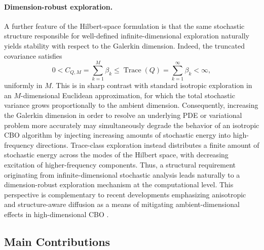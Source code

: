 \documentclass[12pt]{amsart}
\numberwithin{equation}{section}
\begin{document}
\paragraph{\textbf{Dimension-robust exploration.}}
A further feature of the Hilbert-space formulation is that the same stochastic structure responsible for well-defined infinite-dimensional exploration naturally yields stability with respect to the Galerkin dimension. Indeed, the truncated covariance satisfies
\begin{equation*}
    0<C_{Q,M}=\sum_{k=1}^M\beta_k\leq \operatorname{Trace}(Q)=\sum_{k=1}^{\infty}\beta_k<\infty,
\end{equation*}
uniformly in $M$. This is in sharp contrast with standard isotropic exploration in an $M$-dimensional Euclidean approximation, for which the total stochastic variance grows proportionally to the ambient dimension. Consequently, increasing the Galerkin dimension in order to resolve an underlying PDE or variational problem more accurately may simultaneously degrade the behavior of an isotropic CBO algorithm by injecting increasing amounts of stochastic energy into high-frequency directions. Trace-class exploration instead distributes a finite amount of stochastic energy across the modes of the Hilbert space, with decreasing excitation of higher-frequency components. Thus, a structural requirement originating from infinite-dimensional stochastic analysis leads naturally to a dimension-robust exploration mechanism at the computational level. This perspective is complementary to recent developments emphasizing anisotropic and structure-aware diffusion as a means of mitigating ambient-dimensional effects in high-dimensional CBO \cite{bonandin2026exploiting}.

\subsection{Main Contributions}
\end{document}

